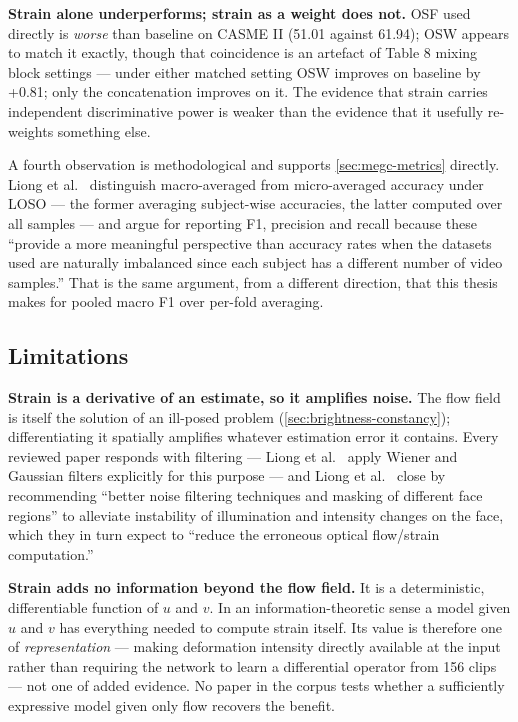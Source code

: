 \textbf{Strain alone underperforms; strain as a weight does not.} OSF used directly is \textit{worse} than baseline on CASME II (51.01 against 61.94); OSW appears to match it exactly, though that coincidence is an artefact of Table 8 mixing block settings --- under either matched setting OSW improves on baseline by +0.81; only the concatenation improves on it. The evidence that strain carries independent discriminative power is weaker than the evidence that it usefully re-weights something else.

A fourth observation is methodological and supports \autoref{sec:megc-metrics} directly. Liong et al.~\cite{liong2016} distinguish macro-averaged from micro-averaged accuracy under LOSO --- the former averaging subject-wise accuracies, the latter computed over all samples --- and argue for reporting F1, precision and recall because these ``provide a more meaningful perspective than accuracy rates when the datasets used are naturally imbalanced since each subject has a different number of video samples.'' That is the same argument, from a different direction, that this thesis makes for pooled macro F1 over per-fold averaging.

\subsection{Limitations}
\label{sec:strain-limitations}

\textbf{Strain is a derivative of an estimate, so it amplifies noise.} The flow field is itself the solution of an ill-posed problem (\autoref{sec:brightness-constancy}); differentiating it spatially amplifies whatever estimation error it contains. Every reviewed paper responds with filtering --- Liong et al.~\cite{liong2014a} apply Wiener and Gaussian filters explicitly for this purpose --- and Liong et al.~\cite{liong2016} close by recommending ``better noise filtering techniques and masking of different face regions'' to alleviate instability of illumination and intensity changes on the face, which they in turn expect to ``reduce the erroneous optical flow/strain computation.''

\textbf{Strain adds no information beyond the flow field.} It is a deterministic, differentiable function of $u$ and $v$. In an information-theoretic sense a model given $u$ and $v$ has everything needed to compute strain itself. Its value is therefore one of \textit{representation} --- making deformation intensity directly available at the input rather than requiring the network to learn a differential operator from 156 clips --- not one of added evidence. No paper in the corpus tests whether a sufficiently expressive model given only flow recovers the benefit.

